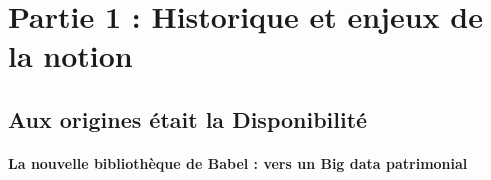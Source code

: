 
\part{Partie 1 : Historique et enjeux de la notion}
\chapter{Aux origines était la Disponibilité}

\subsection{La nouvelle bibliothèque de Babel : vers un Big data patrimonial}

